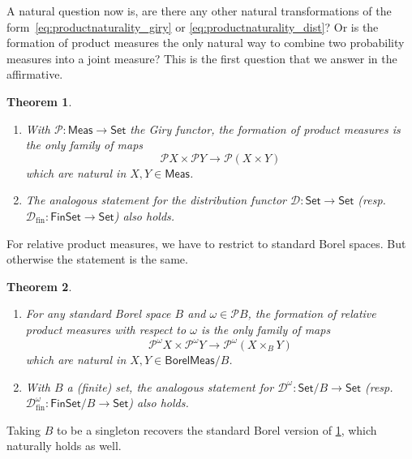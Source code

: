 \documentclass[11pt,a4paper]{scrartcl}
\newcommand{\setc}{\mathsf{Set}}
\newcommand{\finset}{\mathsf{FinSet}}
\newcommand{\meas}{\mathsf{Meas}}
\newcommand{\borelmeas}{\mathsf{BorelMeas}}
\newcommand{\dist}{\mathcal{D}}
\newcommand{\distfin}{\mathcal{D}_{\mathrm{fin}}}
\newcommand{\giry}{\mathcal{P}}
\newtheorem{theo}{Theorem}[section]
\theoremstyle{definition}
\begin{document}
A natural question now is, are there any other natural transformations of the form~\eqref{eq:productnaturality_giry} or \eqref{eq:productnaturality_dist}? 
Or is the formation of product measures the only natural way to combine two probability measures into a joint measure?
This is the first question that we answer in the affirmative.

\begin{theo}
	\label{theo:onenaturaltransformation}
	\begin{enumerate}
		\item 
			With $\giry : \meas \to \setc$ the Giry functor, the formation of product measures is the only family of maps
			\[
				\giry X \times \giry Y \longrightarrow \giry(X \times Y)
			\]
			which are natural in $X, Y \in \meas$.
		\item 
			The analogous statement for the distribution functor $\dist : \setc \to \setc$ (resp.~$\distfin : \finset \to \setc$) also holds.
	\end{enumerate}
\end{theo}

For relative product measures, we have to restrict to standard Borel spaces.
But otherwise the statement is the same.

\begin{theo}
	\label{theo:onenaturaltransformation_relative}
	\begin{enumerate}
		\item 
			For any standard Borel space $B$ and $\omega \in \giry B$,
			the formation of relative product measures with respect to $\omega$ is the only family of maps
			\[
				\giry^\omega X \times \giry^\omega Y \longrightarrow \giry^\omega(X \times_B Y)
			\]
			which are natural in $X, Y \in \borelmeas/B$.
		\item 
			With $B$ a (finite) set, the analogous statement for $\dist^\omega : \setc/B \to \setc$ (resp.~$\distfin^\omega : \finset/B \to \setc$) also holds.
	\end{enumerate}
\end{theo}

Taking $B$ to be a singleton recovers the standard Borel version of \cref{theo:onenaturaltransformation}, which naturally holds as well.
\end{document}
